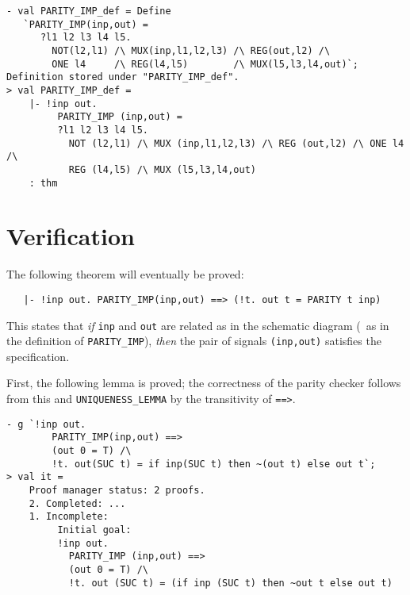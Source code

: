 \begin{session}
\begin{verbatim}
- val PARITY_IMP_def = Define
   `PARITY_IMP(inp,out) =
      ?l1 l2 l3 l4 l5.
        NOT(l2,l1) /\ MUX(inp,l1,l2,l3) /\ REG(out,l2) /\
        ONE l4     /\ REG(l4,l5)        /\ MUX(l5,l3,l4,out)`;
Definition stored under "PARITY_IMP_def".
> val PARITY_IMP_def =
    |- !inp out.
         PARITY_IMP (inp,out) =
         ?l1 l2 l3 l4 l5.
           NOT (l2,l1) /\ MUX (inp,l1,l2,l3) /\ REG (out,l2) /\ ONE l4 /\
           REG (l4,l5) /\ MUX (l5,l3,l4,out)
    : thm
\end{verbatim}
\end{session}\label{parity-imp}

\section{Verification}

The following theorem will eventually be proved:
{\small\begin{verbatim}
   |- !inp out. PARITY_IMP(inp,out) ==> (!t. out t = PARITY t inp)
\end{verbatim}}
This states that {\it if\/} {\small\verb|inp|} and {\small\verb|out|}
are related as in the schematic
diagram (\ie\ as in the definition of {\small\verb|PARITY_IMP|}),
{\it then\/} the
pair of signals {\small\verb|(inp,out)|} satisfies the specification.

First, the following lemma is proved; the correctness of the parity
checker follows from this and {\small\verb|UNIQUENESS_LEMMA|} by the
transitivity of {\small{\tt\verb+==>+}}.

\begin{session}
\begin{verbatim}
- g `!inp out.
        PARITY_IMP(inp,out) ==>
        (out 0 = T) /\
        !t. out(SUC t) = if inp(SUC t) then ~(out t) else out t`;
> val it =
    Proof manager status: 2 proofs.
    2. Completed: ...
    1. Incomplete:
         Initial goal:
         !inp out.
           PARITY_IMP (inp,out) ==>
           (out 0 = T) /\
           !t. out (SUC t) = (if inp (SUC t) then ~out t else out t)
\end{verbatim}
\end{session}

